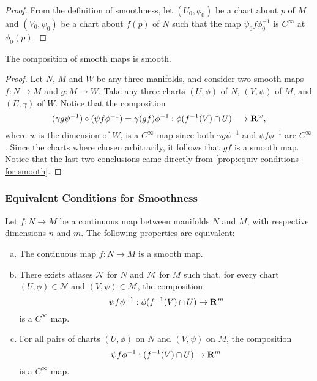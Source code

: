 \begin{proof}
From the definition of smoothness, let \((U_0, \phi_0)\) be a chart about \(p\)
of \(M\) and \((V_0, \psi_0)\) be a chart about \(f(p)\) of \(N\) such that the
map \(\psi_0 f \phi_0^{-1}\) is \(C^{\infty}\) at \(\phi_0(p)\).
\end{proof}

\begin{proposition}
\label{prop:composition-smooth-maps-is-smooth}
The composition of smooth maps is smooth.
\end{proposition}

\begin{proof}
Let \(N\), \(M\) and \(W\) be any three manifolds, and consider two smooth maps
\(f: N \to M\) and \(g: M \to W\). Take any three charts \((U, \phi)\) of \(N\),
\((V, \psi)\) of \(M\), and \((E, \gamma)\) of \(W\). Notice that the
composition
\[
(\gamma g \psi^{-1}) \circ (\psi f \phi^{-1})
= \gamma (g f) \phi^{-1}: \phi(f^{-1}(V) \cap U)
\longrightarrow \mathbf{R}^w,
\]
where \(w\) is the dimension of \(W\), is a \(C^{\infty}\) map since both
\(\gamma g \psi^{-1}\) and \(\psi f \phi^{-1}\) are \(C^{\infty}\). Since the
charts where chosen arbitrarily, it follows that \(g f\) is a smooth map. Notice
that the last two conclusions came directly from
\cref{prop:equiv-conditions-for-smooth}.
\end{proof}

\subsubsection{Equivalent Conditions for Smoothness}

\begin{proposition}
\label{prop:equiv-conditions-for-smooth}
Let \(f: N \to M\) be a continuous map between manifolds \(N\) and \(M\), with
respective dimensions \(n\) and \(m\). The following properties are equivalent:
\begin{enumerate}[(a)]\setlength\itemsep{0em}
\item The continuous map \(f: N \to M\) is a smooth map.

\item There exists atlases \(\mathcal{N}\) for \(N\) and \(\mathcal{M}\) for
  \(M\) such that, for every chart \((U, \phi) \in \mathcal{N}\) and
  \((V, \psi) \in \mathcal{M}\), the composition
  \[
  \psi f \phi^{-1}: \phi(f^{-1}(V) \cap U) \to \mathbf{R}^m
  \]
  is a \(C^{\infty}\) map.

\item For all pairs of charts \((U, \phi)\) on \(N\) and \((V, \psi)\) on \(M\),
  the composition
  \[
  \psi f \phi^{-1}: (f^{-1}(V) \cap U) \to  \mathbf{R}^m
  \]
  is a \(C^{\infty}\) map.
\end{enumerate}
\end{proposition}

